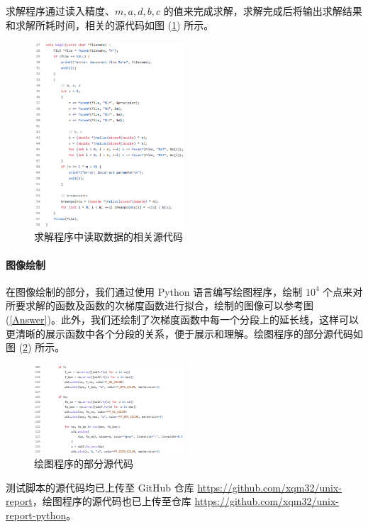 求解程序通过读入精度、$m,a,d,b,c$ 的值来完成求解，求解完成后将输出求解结果和求解所耗时间，相关的源代码如图 (\ref{Begin}) 所示。
\begin{figure}[htb]
    \centering
    \includegraphics[width=0.5\textwidth]{figures/c@begin().png}
    \caption{求解程序中读取数据的相关源代码}
    \label{Begin}
\end{figure}

\paragraph{图像绘制}

在图像绘制的部分，我们通过使用 Python 语言编写绘图程序，绘制 $10^4$ 个点来对所要求解的函数及函数的次梯度函数进行拟合，绘制的图像可以参考图 (\ref{Answer})。此外，我们还绘制了次梯度函数中每一个分段上的延长线，这样可以更清晰的展示函数中各个分段的关系，便于展示和理解。绘图程序的部分源代码如图 (\ref{Plot}) 所示。
\begin{figure}[htb]
    \centering
    \includegraphics[width=0.5\textwidth]{figures/py@plt.png}
    \caption{绘图程序的部分源代码}
    \label{Plot}
\end{figure}

测试脚本的源代码均已上传至 GitHub 仓库 \href{https://github.com/xqm32/unix-report}{https://github.com/xqm32/unix-report}，绘图程序的源代码也已上传至仓库 \href{https://github.com/xqm32/unix-report-python}{https://github.com/xqm32/unix-report-python}。